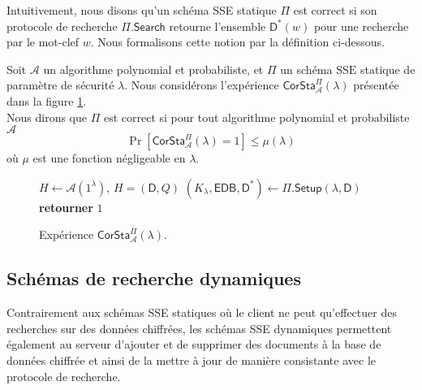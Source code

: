 Intuitivement, nous disons qu'un schéma SSE statique $\mathsf{\Pi}$ est correct
si son protocole de recherche $\mathsf{\Pi}.\mathsf{Search}$ retourne l'ensemble
$\mathsf{D}^*(w)$ pour une recherche par le mot-clef $w$. Nous formalisons cette
notion par la définition ci-dessous.

\begin{defi}
Soit $\mathcal{A}$ un algorithme polynomial et probabiliste, et $\mathsf{\Pi}$
un schéma $\mathrm{SSE}$ statique de paramètre de sécurité $\lambda$. Nous
considérons l'expérience $\mathsf{CorSta}_\mathcal{A}^\mathsf{\Pi}(\lambda)$
présentée dans la figure \ref{corsta}.\\
Nous dirons que $\mathsf{\Pi}$ est correct si pour tout algorithme polynomial et
probabiliste $\mathcal{A}$
\begin{displaymath}
\Pr\left[\mathsf{CorSta}_\mathcal{A}^\mathsf{\Pi}(\lambda)=1\right] \leqslant
\mu(\lambda)
\end{displaymath}
où $\mu$ est une fonction négligeable en $\lambda$.
\end{defi}

\begin{figure}[h]
\centering
\begin{algorithm}[H]
$H \leftarrow \mathcal{A}(1^\lambda)$, $H=(\mathsf{D},Q)$ \;
$(K_\lambda,\mathsf{EDB},\mathsf{D}^*) \leftarrow \mathsf{\Pi}.\mathsf{Setup}
(\lambda,\mathsf{D})$ \;
\BlankLine
{}
\BlankLine
{}
{\textbf{retourner} $1$ \;}
\end{algorithm}
\caption{Expérience $\mathsf{CorSta}_\mathcal{A}^\mathsf{\Pi}(\lambda)$.}
\label{corsta}
\end{figure}

\subsection{Schémas de recherche dynamiques}
Contrairement aux schémas SSE statiques où le client ne peut qu'effectuer des
recherches sur des données chiffrées, les schémas SSE dynamiques permettent
également au serveur d'ajouter et de supprimer des documents à la base de
données chiffrée et ainsi de la mettre à jour de manière consistante avec le
protocole de recherche.

